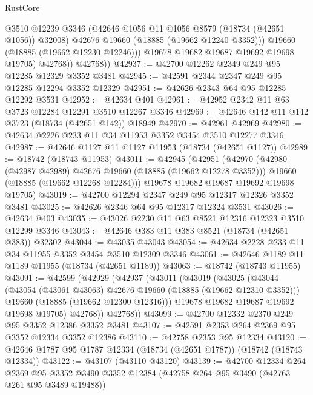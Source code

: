 \begin{lexlean}{RustCore}
\begin{coremodule}
                  @3510
                  @12239
                  @3346
                  (@42646 @1056 @11 @1056 @8579 (@18734 (@42651 @1056)) @32008)
                  @42676
                  @19660
                  (@18885 (@19662 @12240 @3352)))
                @19660
                (@18885 (@19662 @12230 @12246)))
              @19678
              @19682
              @19687
              @19692
              @19698
              @19705)
            @42768))
        @42768))
@42937 := @42700 @12262 @2349 @249 @95 @12285 @12329 @3352 @3481
@42945 := @42591 @2344 @2347 @249 @95 @12285 @12294 @3352 @12329
@42951 := @42626 @2343 @64 @95 @12285 @12292 @3531
@42952 := @42634 @401
@42961 := @42952 @2342 @11 @63 @3723 @12284 @12291 @3510 @12267 @3346
@42969 := @42646 @142 @11 @142 @3723 (@18734 (@42651 @142)) @18949
@42970 := @42961 @42969
@42980 := @42634 @2226 @233 @11 @34 @11953 @3352 @3454 @3510 @12277 @3346
@42987 := @42646 @1127 @11 @1127 @11953 (@18734 (@42651 @1127))
@42989 := @18742 (@18743 @11953)
@43011 := @42945
    (@42951
      (@42970
        (@42980 (@42987 @42989) @42676 @19660 (@18885 (@19662 @12278 @3352)))
        @19660
        (@18885 (@19662 @12268 @12284)))
      @19678
      @19682
      @19687
      @19692
      @19698
      @19705)
@43019 := @42700 @12294 @2347 @249 @95 @12317 @12326 @3352 @3481
@43025 := @42626 @2346 @64 @95 @12317 @12324 @3531
@43026 := @42634 @403
@43035 := @43026 @2230 @11 @63 @8521 @12316 @12323 @3510 @12299 @3346
@43043 := @42646 @383 @11 @383 @8521 (@18734 (@42651 @383)) @32302
@43044 := @43035 @43043
@43054 := @42634 @2228 @233 @11 @34 @11955 @3352 @3454 @3510 @12309 @3346
@43061 := @42646 @1189 @11 @1189 @11955 (@18734 (@42651 @1189))
@43063 := @18742 (@18743 @11955)
@43091 := @42599
    (@42929
      (@42937
        (@43011
          (@43019
            (@43025
              (@43044
                (@43054 (@43061 @43063) @42676 @19660 (@18885 (@19662 @12310 @3352)))
                @19660
                (@18885 (@19662 @12300 @12316)))
              @19678
              @19682
              @19687
              @19692
              @19698
              @19705)
            @42768))
        @42768))
@43099 := @42700 @12332 @2370 @249 @95 @3352 @12386 @3352 @3481
@43107 := @42591 @2353 @264 @2369 @95 @3352 @12334 @3352 @12386
@43110 := @42758 @2353 @95 @12334
@43120 := @42646 @1787 @95 @1787 @12334 (@18734 (@42651 @1787)) (@18742 (@18743 @12334))
@43122 := @43107 (@43110 @43120)
@43139 := @42700
    @12334
    @264
    @2369
    @95
    @3352
    @3490
    @3352
    @12384
    (@42758 @264 @95 @3490 (@42763 @261 @95 @3489 @19488))

\end{coremodule}
\end{lexlean}
